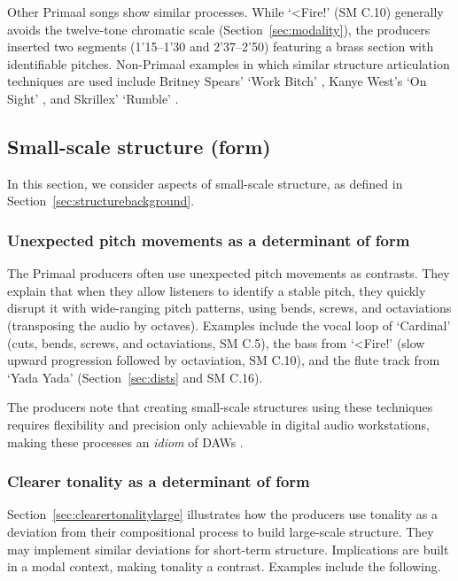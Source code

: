 \documentclass{article}
\begin{document}
Other Primaal songs show similar processes. While `<Fire!' (SM C.10) generally avoids the twelve-tone chromatic scale (Section~\ref{sec:modality}), the producers inserted two segments (1'15--1'30 and 2'37--2'50) featuring a brass section with identifiable pitches. Non-Primaal examples in which similar structure articulation techniques are used include Britney Spears' `Work Bitch' \citep[2'49--3'19]{britney2013workbitch}, Kanye West's `On Sight' \citep[1'17--1'30]{kanyewest2013onsight}, and Skrillex' `Rumble' \citep[1'02--1'15 and 2'11--end]{skrillex2023rumble}.



\subsection{Small-scale structure (form)}\label{sec:smallscalestructure}

In this section, we consider aspects of small-scale structure, as defined in Section~\ref{sec:structurebackground}. 

\subsubsection{Unexpected pitch movements as a determinant of form}\label{sec:smallscale1}

The Primaal producers often use unexpected pitch movements as contrasts. They explain that when they allow listeners to identify a stable pitch, they quickly disrupt it with wide-ranging pitch patterns, using bends, screws, and octaviations (transposing the audio by octaves). Examples include the vocal loop of `Cardinal' (cuts, bends, screws, and octaviations, SM C.5), the bass from `<Fire!' (slow upward progression followed by octaviation, SM C.10), and the flute track from `Yada Yada' (Section~\ref{sec:dists} and SM C.16). 

The producers note that creating small-scale structures using these techniques requires flexibility and precision only achievable in digital audio workstations, making these processes an \emph{idiom} of DAWs \citep{huron2009characterizing}.


\subsubsection{Clearer tonality as a determinant of form}\label{sec:clearertonalitysmall}\label{sec:smallscale2}

Section~\ref{sec:clearertonalitylarge} illustrates how the producers use tonality as a deviation from their compositional process to build large-scale structure. They may implement similar deviations for short-term structure. Implications are built in a modal context, making tonality a contrast. Examples include the following.
\end{document}
